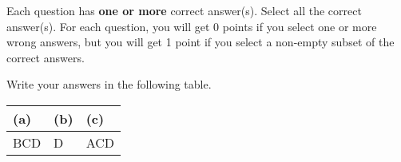 
Each question has \textbf{one or more} correct answer(s). Select all the correct answer(s). For each question, you will get 0 points if you select one or more wrong answers, but you will get 1 point if you select a non-empty subset of the correct answers.

Write your answers in the following table.


\begin{table}[htbp]
	\centering
	\begin{tabular}{|p{2cm}|p{2cm}|p{2cm}|}
		\hline
		(a) & (b) & (c) \\
		\hline
		  BCD  &  D   &  ACD   \\
		\hline
	\end{tabular}
\end{table}

